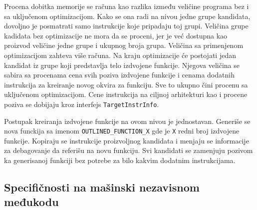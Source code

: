 \documentclass[12pt,oneside]{memoir}
\begin{document}
Procena dobitka memorije se računa kao razlika između veličine programa bez i sa uključenom optimizacijom.
Kako se ona radi na nivou jedne grupe kandidata, dovoljno je posmatrati samo instrukcije koje pripadaju toj grupi. %
Veličina grupe kadidata bez optimizacije ne mora da se proceni, jer je već dostupna kao proizvod veličine jedne grupe i ukupnog broja grupa.
Veličina sa primenjenom optimizacijom zahteva više računa.
Na kraju optimizacije će postojati jedan kandidat iz grupe koji predstavlja telo izdvojene funkcije.
Njegova veličina se sabira sa procenama cena svih poziva izdvojene funkcije i cenama dodatnih instrukcija za kreiranje novog okvira za funkciju.
Sve to ukupno čini procenu sa uključenom optimizacijom.
Cene instrukcija na ciljnoj arhitekturi kao i procene poziva se dobijaju kroz interfejs \verb|TargetInstrInfo|.

Postupak kreiranja izdvojene funkcije na ovom nivou je jednostavan.
Generiše se nova funckija sa imenom \verb|OUTLINED_FUNCTION_X| gde je \verb|X| redni broj izdvojene funkcije.
Kopiraju se instrukcije proizvoljnog kandidata i menjaju se informacije za debagovanje da referišu na novu funkciju.
Svi kandidati se zamenjuju pozivom ka generisanoj funkciji bez potrebe za bilo kakvim dodatnim instrukcijama.

\subsection{Specifičnosti na mašinski nezavisnom međukodu}

\end{document}
